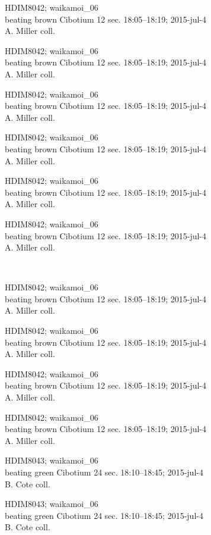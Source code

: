 \documentclass[2pt]{extarticle}
\begin{document}
\noindent
\parbox{0.16\textwidth}{\tiny \raggedright \rule[-0.3\baselineskip]{0pt}{10pt}HDIM8042; waikamoi\_06\\ beating brown Cibotium 12 sec. 18:05--18:19; 2015-jul-4\\ A. Miller coll.}
\parbox{0.16\textwidth}{\tiny \raggedright \rule[-0.3\baselineskip]{0pt}{10pt}HDIM8042; waikamoi\_06\\ beating brown Cibotium 12 sec. 18:05--18:19; 2015-jul-4\\ A. Miller coll.}
\parbox{0.16\textwidth}{\tiny \raggedright \rule[-0.3\baselineskip]{0pt}{10pt}HDIM8042; waikamoi\_06\\ beating brown Cibotium 12 sec. 18:05--18:19; 2015-jul-4\\ A. Miller coll.}
\parbox{0.16\textwidth}{\tiny \raggedright \rule[-0.3\baselineskip]{0pt}{10pt}HDIM8042; waikamoi\_06\\ beating brown Cibotium 12 sec. 18:05--18:19; 2015-jul-4\\ A. Miller coll.}
\parbox{0.16\textwidth}{\tiny \raggedright \rule[-0.3\baselineskip]{0pt}{10pt}HDIM8042; waikamoi\_06\\ beating brown Cibotium 12 sec. 18:05--18:19; 2015-jul-4\\ A. Miller coll.}
\parbox{0.16\textwidth}{\tiny \raggedright \rule[-0.3\baselineskip]{0pt}{10pt}HDIM8042; waikamoi\_06\\ beating brown Cibotium 12 sec. 18:05--18:19; 2015-jul-4\\ A. Miller coll.} \\ 
\vspace{0.001in} 

\noindent
\parbox{0.16\textwidth}{\tiny \raggedright \rule[-0.3\baselineskip]{0pt}{10pt}HDIM8042; waikamoi\_06\\ beating brown Cibotium 12 sec. 18:05--18:19; 2015-jul-4\\ A. Miller coll.}
\parbox{0.16\textwidth}{\tiny \raggedright \rule[-0.3\baselineskip]{0pt}{10pt}HDIM8042; waikamoi\_06\\ beating brown Cibotium 12 sec. 18:05--18:19; 2015-jul-4\\ A. Miller coll.}
\parbox{0.16\textwidth}{\tiny \raggedright \rule[-0.3\baselineskip]{0pt}{10pt}HDIM8042; waikamoi\_06\\ beating brown Cibotium 12 sec. 18:05--18:19; 2015-jul-4\\ A. Miller coll.}
\parbox{0.16\textwidth}{\tiny \raggedright \rule[-0.3\baselineskip]{0pt}{10pt}HDIM8042; waikamoi\_06\\ beating brown Cibotium 12 sec. 18:05--18:19; 2015-jul-4\\ A. Miller coll.}
\parbox{0.16\textwidth}{\tiny \raggedright \rule[-0.3\baselineskip]{0pt}{10pt}HDIM8043; waikamoi\_06\\ beating green Cibotium 24 sec. 18:10--18:45; 2015-jul-4\\ B. Cote coll.}
\parbox{0.16\textwidth}{\tiny \raggedright \rule[-0.3\baselineskip]{0pt}{10pt}HDIM8043; waikamoi\_06\\ beating green Cibotium 24 sec. 18:10--18:45; 2015-jul-4\\ B. Cote coll.} \\ 
\vspace{0.001in} 
\end{document}
